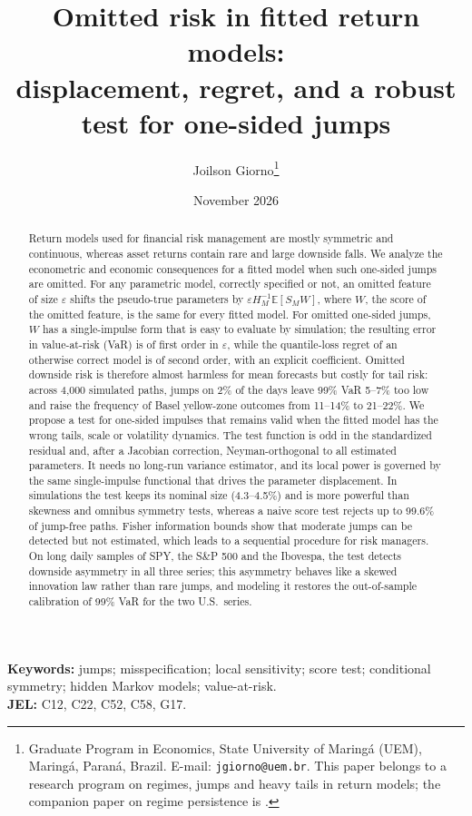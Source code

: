 \documentclass[11pt,a4paper]{article}
\title{Omitted risk in fitted return models:\\ displacement, regret, and a robust test for one-sided jumps}
\author{Joilson Giorno\thanks{Graduate Program in Economics, State University of Maring\'a (UEM), Maring\'a, Paran\'a, Brazil. E-mail: \texttt{jgiorno@uem.br}. This paper belongs to a research program on regimes, jumps and heavy tails in return models; the companion paper on regime persistence is \citet{giornoA}.}}
\date{November 2026}
\theoremstyle{definition}
\theoremstyle{remark}
\newcommand{\E}{\mathbb{E}}
\begin{document}
\maketitle

\begin{abstract}
Return models used for financial risk management are mostly symmetric and continuous, whereas asset returns contain rare and large downside falls. We analyze the econometric and economic consequences for a fitted model when such one-sided jumps are omitted. For any parametric model, correctly specified or not, an omitted feature of size $\varepsilon$ shifts the pseudo-true parameters by $\varepsilon H_M^{-1}\E[S_MW]$, where $W$, the score of the omitted feature, is the same for every fitted model. For omitted one-sided jumps, $W$ has a single-impulse form that is easy to evaluate by simulation; the resulting error in value-at-risk (VaR) is of first order in $\varepsilon$, while the quantile-loss regret of an otherwise correct model is of second order, with an explicit coefficient. Omitted downside risk is therefore almost harmless for mean forecasts but costly for tail risk: across 4{,}000 simulated paths, jumps on 2\% of the days leave 99\% VaR 5--7\% too low and raise the frequency of Basel yellow-zone outcomes from 11--14\% to 21--22\%. We propose a test for one-sided impulses that remains valid when the fitted model has the wrong tails, scale or volatility dynamics. The test function is odd in the standardized residual and, after a Jacobian correction, Neyman-orthogonal to all estimated parameters. It needs no long-run variance estimator, and its local power is governed by the same single-impulse functional that drives the parameter displacement. In simulations the test keeps its nominal size (4.3--4.5\%) and is more powerful than skewness and omnibus symmetry tests, whereas a naive score test rejects up to 99.6\% of jump-free paths. Fisher information bounds show that moderate jumps can be detected but not estimated, which leads to a sequential procedure for risk managers. On long daily samples of SPY, the S\&P 500 and the Ibovespa, the test detects downside asymmetry in all three series; this asymmetry behaves like a skewed innovation law rather than rare jumps, and modeling it restores the out-of-sample calibration of 99\% VaR for the two U.S.\ series.
\end{abstract}

\noindent\textbf{Keywords:} jumps; misspecification; local sensitivity; score test; conditional symmetry; hidden Markov models; value-at-risk.\\
\textbf{JEL:} C12, C22, C52, C58, G17.
\end{document}
